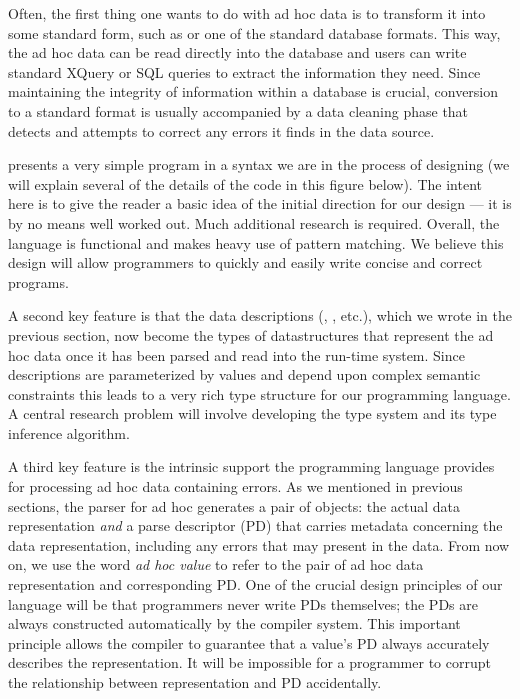 \documentclass[11pt]{article}
\begin{document}
Often, the first thing one wants to do with ad hoc data 
is to transform it into some standard form, such as \xml{}
or one of the standard database formats.  This way,
the ad hoc data can be read directly into the database
and users can write standard XQuery or SQL queries to extract the information 
they need.  Since maintaining the integrity of information
within a database is crucial, conversion to a standard format
is usually accompanied by a data cleaning phase that detects
and attempts to correct any errors it finds in the data source.

 presents a very simple \datatype{}
program in a syntax we are in the process of designing (we
will explain several of the details of the code in this figure below).  The
intent here is to give the reader a basic idea of the initial direction
for our design --- it is by no means well worked out.  Much additional
research is required.  Overall, the language is functional
and makes heavy use of pattern matching.  We believe this design will
allow programmers to quickly and easily write concise and correct
programs.  

A second key feature is that the data descriptions 
(, , etc.),
which we wrote in the previous section, now become the types
of datastructures that represent the ad hoc data once it has been
parsed and read into the run-time system.  Since \datatype{} descriptions
are parameterized by values and depend upon complex semantic constraints
this leads to a very rich type structure for our programming language.
A central research problem will involve developing the type system
and its type inference algorithm.

A third key feature is the intrinsic support the programming language provides
for processing ad hoc data containing errors.  As we mentioned in previous
sections, the parser for ad hoc generates a pair of objects:
the actual data representation {\em and} a parse descriptor (PD)
that carries metadata concerning the data representation,
including any errors that may present in the data.
From now on, we use the word {\em ad hoc value} to refer to
the pair of ad hoc data representation and corresponding PD.
One of the crucial design principles of our language will be
that programmers never write PDs themselves; the
PDs are always constructed automatically by the
compiler system.  This important principle allows the compiler
to guarantee that a value's PD always accurately describes the representation.
It will be impossible for a programmer to corrupt the relationship
between representation and PD accidentally.  
\end{document}
